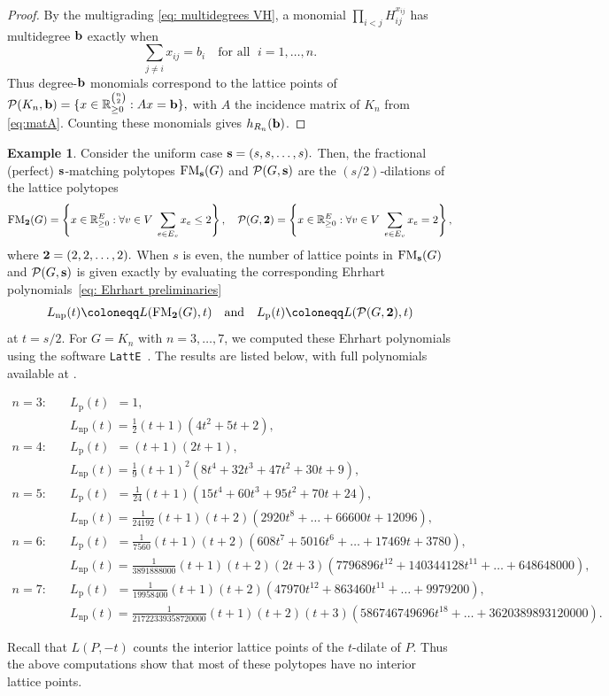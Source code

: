 \documentclass[12pt,a4paper]{extarticle}
\theoremstyle{definition}
\newtheorem{example}[theorem]{Example}
\begin{document}
\begin{proof}
By the multigrading \eqref{eq: multidegrees VH}, a monomial
$\prod_{i<j}H_{ij}^{x_{ij}}$ has multidegree ${\bf b}$ exactly when
$$ \textstyle
\sum_{j\neq i} x_{ij} = b_i \quad \text{for all } \;i=1,\ldots,n.
$$
Thus degree-${\bf b}$ monomials correspond to the lattice points of
${
\mathcal{P}(K_n,{\bf b})
=
\{x\in\mathbb{R}_{\ge0}^{\binom{n}{2}}:Ax={\bf b}\}},
$
with $A$ the incidence matrix of $K_n$ from \eqref{eq:matA}. Counting these
monomials gives $h_{R_n}({\bf b})$.
\end{proof}
\begin{example}\label{ex: polytopes equal spins}
Consider the uniform case
$
{\bf s}=(s,s,\ldots,s).
$
Then, the fractional (perfect) ${\bf s}$‑matching polytopes
${\rm FM}_{\bf s}(G)$ and $\mathcal{P}(G,{\bf s})$ are  the  $(s/2)$‑dilations of the lattice polytopes 
\[
{\rm FM}_{\bf 2}(G) =
\left\{
x \in \mathbb{R}_{\ge 0}^E :
\forall v \in V \; \sum_{e \in E_v} x_e \le 2 
\right\}, \quad
\mathcal{P}(G, {\bf 2}) =
\left\{
x \in \mathbb{R}_{\ge 0}^E :
\forall v \in V \; \sum_{e \in E_v} x_e = 2
\right\},
\]
where $
{\bf 2}=(2,2,\ldots,2).
$
When $s$ is even, the number of lattice points in
${\rm FM}_{\bf s}(G)$ and $\mathcal{P}(G,{\bf s})$ is given exactly by evaluating the
corresponding Ehrhart polynomials~\eqref{eq: Ehrhart preliminaries}
$$L_{\mathrm{np}}(t) \coloneqq L({\rm FM}_{\bf 2}(G), t) \quad   \text{and} \quad L_{\mathrm{p}}(t) \coloneqq L(\mathcal{P}(G,{\bf 2}),t)$$
at
$t=s/2$.
For $G=K_n$ with $n=3,\ldots,7$, we computed these Ehrhart polynomials using the software \texttt{LattE}~\cite{Latte}. The results are listed below, with full polynomials available at \cite{zenodo}.
\begin{footnotesize}
\begin{align*}
n=3:\quad
 & L_{\mathrm{p}}(t) \;\,=1, \\
 & L_{\mathrm{np}}(t)=\tfrac{1}{2}(t+1)(4t^2+5t+2), \\[5pt]
n=4:\quad
 & L_{\mathrm{p}}(t)\;\,=(t+1)(2t+1), \\
 & L_{\mathrm{np}}(t)=\tfrac{1}{9}(t+1)^2(8t^4+32t^3+47t^2+30t+9), \\[5pt]
n=5:\quad
& L_{\mathrm{p}}(t)\;\,=\tfrac{1}{24}(t+1)(15t^4+60t^3+95t^2+70t+24), \\
 & L_{\mathrm{np}}(t)=\tfrac{1}{24192}(t+1)(t+2)
(2920t^8+\ldots+66600t+12096),  \\[5pt]
n=6:\quad
& L_{\mathrm{p}}(t) \;\,=\tfrac{1}{7560}(t+1)(t+2)
(608t^7+5016t^6+\ldots+17469t+3780), \\
& L_{\mathrm{np}}(t)=\tfrac{1}{3891888000}(t+1)(t+2)(2t+3)
(7796896t^{12}+140344128t^{11}+\ldots+648648000), \\[5pt]
n=7:\quad
& L_{\mathrm{p}}(t) \;\,=\tfrac{1}{19958400}(t+1)(t+2)
(47970t^{12}+863460t^{11}+\ldots+9979200),\\
& L_{\mathrm{np}}(t)=\tfrac{1}{21722339358720000}{(t+1)(t+2)(t+3)}
(586746749696t^{18}+\ldots+3620389893120000).
\end{align*}
\end{footnotesize}
Recall that $L(P,-t)$ counts the interior lattice points of the $t$-dilate of
$P$. Thus the above computations show that most of these polytopes have no
interior lattice points.
\end{example}
\end{document}
